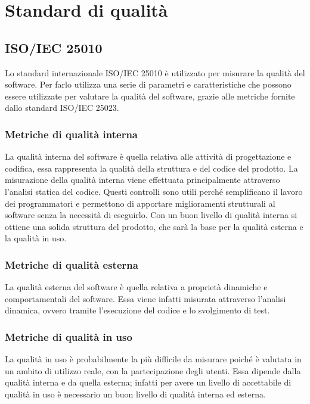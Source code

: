 \appendix
\section{Standard di qualità}
	\subsection{ISO/IEC 25010}
		Lo standard internazionale ISO/IEC 25010 è utilizzato per misurare la qualità del software.
		Per farlo utilizza una serie di parametri e caratteristiche che possono essere utilizzate per valutare la qualità del software, grazie alle metriche fornite dallo standard ISO/IEC 25023.
		\subsubsection{Metriche di qualità interna}
			La qualità interna del software è quella relativa alle attività di progettazione e codifica, essa rappresenta la qualità della struttura e del codice del prodotto.
			La misurazione della qualità interna viene effettuata principalmente attraverso l'analisi statica del codice.
			Questi controlli sono utili perché semplificano il lavoro dei programmatori e permettono di apportare miglioramenti strutturali al software senza la necessità di eseguirlo.
			Con un buon livello di qualità interna si ottiene una solida struttura del prodotto, che sarà la base per la qualità esterna e la qualità in uso.
		\subsubsection{Metriche di qualità esterna}
			La qualità esterna del software è quella relativa a proprietà dinamiche e comportamentali del software. Essa viene infatti misurata attraverso l'analisi dinamica, ovvero tramite l'esecuzione del codice e lo svolgimento di test.
		\subsubsection{Metriche di qualità in uso}
			La qualità in uso è probabilmente la più difficile da misurare poiché è valutata in un ambito di utilizzo reale, con la partecipazione degli utenti.
			Essa dipende dalla qualità interna e da quella esterna; infatti per avere un livello di accettabile di qualità in uso è necessario un buon livello di qualità interna ed esterna.
